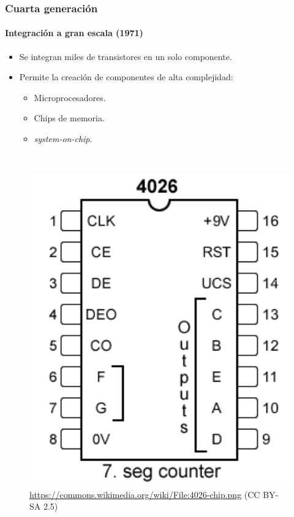 \documentclass[11pt,a4paper,spanish]{beamer}
\begin{document}
\begin{frame}

\frametitle{Cuarta generación}
\framesubtitle{Integración a gran escala (1971)}

\begin{minipage}{0.66\textwidth}
\begin{itemize}
    \item Se integran miles de transistores en un solo componente.
    \item Permite la creación de componentes de alta complejidad:
        \begin{itemize}
            \item Microprocesadores.
            \item Chips de memoria.
            \item \emph{system-on-chip}.
        \end{itemize}
\end{itemize}
\end{minipage}
~
\begin{minipage}{0.3\textwidth}
\begin{figure}
    \includegraphics[width=1.0\textwidth]{img/4026-chip.png}
    \captionsetup{textfont=tiny,labelformat=empty}
    \caption{\url{https://commons.wikimedia.org/wiki/File:4026-chip.png} (CC BY-SA 2.5)}
\end{figure}
\end{minipage}

\end{frame}
\end{document}
